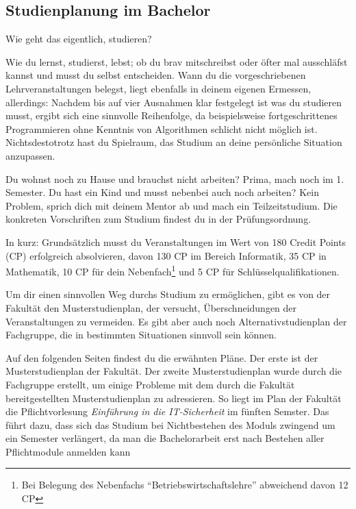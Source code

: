 
\subsection{Studienplanung im Bachelor}

Wie geht das eigentlich, studieren?

Wie du lernst, studierst, lebst; ob du brav mitschreibst oder öfter mal ausschläfst kannst und musst du selbst entscheiden. Wann du die vorgeschriebenen Lehrveranstaltungen belegst, liegt ebenfalls in deinem eigenen Ermessen, allerdings: Nachdem bis auf vier Ausnahmen klar festgelegt ist was du studieren musst, ergibt sich eine sinnvolle Reihenfolge, da beispielsweise fortgeschrittenes Programmieren ohne Kenntnis von Algorithmen schlicht nicht möglich ist. Nichtsdestotrotz hast du Spielraum, das Studium an deine persönliche Situation anzupassen.

Du wohnst noch zu Hause und brauchst nicht arbeiten? Prima, mach noch \iftoggle{winter}{Theoretische Informatik 1}{Technische Informatik 2} im 1. Semester. Du hast ein Kind und musst nebenbei auch noch arbeiten? Kein Problem, sprich dich mit deinem Mentor ab und mach ein Teilzeitstudium. Die konkreten Vorschriften zum Studium findest du in der Prüfungsordnung.


In kurz: Grundsätzlich musst du Veranstaltungen im Wert von 180 Credit Points (CP) erfolgreich absolvieren, davon 130 CP im Bereich Informatik, 35 CP in Mathematik, 10 CP für dein Nebenfach\footnote{Bei Belegung des Nebenfachs \enquote{Betriebswirtschaftslehre} abweichend davon 12 CP} und 5 CP für Schlüsselqualifikationen. 


Um dir einen sinnvollen Weg durchs Studium zu ermöglichen, gibt es von der Fakultät den Musterstudienplan, der versucht, Überschneidungen der Veranstaltungen zu vermeiden. Es gibt aber auch noch Alternativstudienplan der Fachgruppe, die in bestimmten Situationen sinnvoll sein können. 

Auf den folgenden Seiten findest du die erwähnten Pläne. Der erste ist der Musterstudienplan der Fakultät. Der zweite Musterstudienplan wurde durch die Fachgruppe erstellt, um einige Probleme mit dem durch die Fakultät bereitgestellten Musterstudienplan zu adressieren. So liegt im Plan der Fakultät die Pflichtvorlesung \emph{Einführung in die IT-Sicherheit} im fünften Semster. Das führt dazu, dass sich das Studium bei Nichtbestehen des Moduls zwingend um ein Semester verlängert, da man die Bachelorarbeit erst nach Bestehen aller Pflichtmodule anmelden kann

